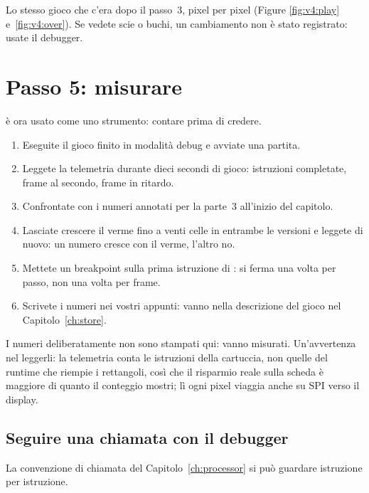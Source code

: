 \begin{prgcheck}
Lo stesso gioco che c'era dopo il passo~3, pixel per pixel (Figure
\ref{fig:v4:play} e~\ref{fig:v4:over}). Se vedete scie o buchi, un cambiamento
non è stato registrato: usate il debugger.
\end{prgcheck}

\section{Passo 5: misurare}

\prgqt è ora usato come uno strumento: contare prima di credere.

\begin{prgtry}
\begin{enumerate}[nosep]
\item Eseguite il gioco finito in modalità debug e avviate una partita.
\item Leggete la telemetria durante dieci secondi di gioco: istruzioni
  completate, frame al secondo, frame in ritardo.
\item Confrontate con i numeri annotati per la parte~3 all'inizio del
  capitolo.
\item Lasciate crescere il verme fino a venti celle in entrambe le versioni e
  leggete di nuovo: un numero cresce con il verme, l'altro no.
\item Mettete un breakpoint sulla prima istruzione di : si
  ferma una volta per passo, non una volta per frame.
\item Scrivete i numeri nei vostri appunti: vanno nella descrizione del gioco
  nel Capitolo~\ref{ch:store}.
\end{enumerate}
\end{prgtry}

I numeri deliberatamente non sono stampati qui: vanno misurati. Un'avvertenza
nel leggerli: la telemetria conta le istruzioni della cartuccia, non quelle
del runtime che riempie i rettangoli, così che il risparmio reale sulla scheda
è maggiore di quanto il conteggio mostri; lì ogni pixel viaggia anche su SPI
verso il display.

\subsection{Seguire una chiamata con il debugger}

La convenzione di chiamata del Capitolo~\ref{ch:processor} si può guardare
istruzione per istruzione.


